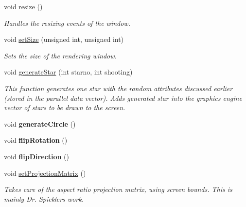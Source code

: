 \begin{DoxyCompactItemize}
\mbox{\label{class_graphics_engine_a6a38e40ee4227a8b53dddf07f92323ee}} 
void \hyperlink{class_graphics_engine_a6a38e40ee4227a8b53dddf07f92323ee}{resize} ()
\begin{DoxyCompactList}\small\item\em Handles the resizing events of the window. \end{DoxyCompactList}\item 
void \hyperlink{class_graphics_engine_aac1a9cc3d195ed1f28018dffd80dae41}{set\+Size} (unsigned int, unsigned int)
\begin{DoxyCompactList}\small\item\em Sets the size of the rendering window. \end{DoxyCompactList}\item 
void \hyperlink{class_graphics_engine_ac5de239348a9c4acb443bb83eb15bab0}{generate\+Star} (int starno, int shooting)
\begin{DoxyCompactList}\small\item\em This function generates one star with the random attributes discussed earlier (stored in the parallel data vector). Adds generated star into the graphics engine vector of stars to be drawn to the screen. \end{DoxyCompactList}\item 
\mbox{\label{class_graphics_engine_afb6a448f4f0ea2b5ea0a8c267e9068db}} 
void {\bfseries generate\+Circle} ()
\item 
\mbox{\label{class_graphics_engine_a02286410101311de4b82597dadf7ee8c}} 
void {\bfseries flip\+Rotation} ()
\item 
\mbox{\label{class_graphics_engine_a848a13a398511272c1ae33de7f072cad}} 
void {\bfseries flip\+Direction} ()
\item 
\mbox{\label{class_graphics_engine_ad08e9c3cefa14b160d478520b3f9b376}} 
void \hyperlink{class_graphics_engine_ad08e9c3cefa14b160d478520b3f9b376}{set\+Projection\+Matrix} ()
\begin{DoxyCompactList}\small\item\em Takes care of the aspect ratio projection matrix, using screen bounds. This is mainly Dr. Spickler\textquotesingle{}s work. \end{DoxyCompactList}\item 

\end{DoxyCompactItemize}
